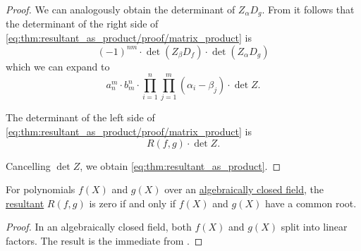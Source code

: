 \begin{proof}
  We can analogously obtain the determinant of \( Z_\alpha D_g \). From  it follows that the determinant of the right side of \eqref{eq:thm:resultant_as_product/proof/matrix_product} is
  \begin{equation*}
    (-1)^{nm} \cdot \det(Z_\beta D_f) \cdot \det(Z_\alpha D_g)
  \end{equation*}
  which we can expand to
  \begin{equation*}
    a_n^m \cdot b_m^n \cdot \prod_{i=1}^n \prod_{j=1}^m (\alpha_i - \beta_j) \cdot \det Z.
  \end{equation*}

  The determinant of the left side of \eqref{eq:thm:resultant_as_product/proof/matrix_product} is
  \begin{equation*}
    R(f, g) \cdot \det Z.
  \end{equation*}

  Cancelling \( \det Z \), we obtain \eqref{eq:thm:resultant_as_product}.
\end{proof}

\begin{corollary}\label{thm:resultant_invertibility}
  For polynomials \( f(X) \) and \( g(X) \) over an \hyperref[def:algebraically_closed_field]{algebraically closed field}, the \hyperref[def:resultant]{resultant} \( R(f, g) \) is zero if and only if \( f(X) \) and \( g(X) \) have a common root.
\end{corollary}
\begin{proof}
  In an algebraically closed field, both \( f(X) \) and \( g(X) \) split into linear factors. The result is the immediate from .
\end{proof}

